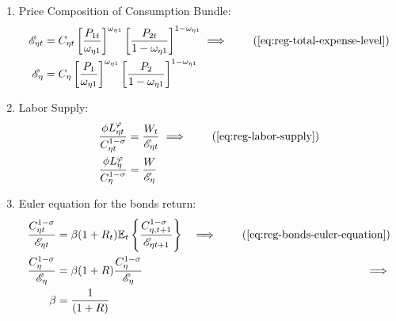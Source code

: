 \documentclass[../thesis.tex]{subfiles}
\begin{document}
\begin{enumerate}
\begin{comment}
	\item Regional Consumption of good 1:
\begin{align}
	C_{\eta 1 t} &= \te \frac{\omega_{\eta 1}}{P_{1 t}} \implies \tag{\ref{eq:reg-Cn-Cn-2}} \\
	C_{\eta 1} &= \te[] \frac{\omega_{\eta 1}}{P_{1}} \label{eq:reg-ss-C1-Cn-2}
\end{align}

\item Regional Consumption of good 2:
\begin{align}
	C_{\eta 2 t} &= \te \frac{1 -\omega_{\eta 1}}{P_{2 t}} \implies \tag{\ref{eq:reg-Cn-Cv-2}} \\
	C_{\eta 2} &= \te[] \frac{1 -\omega_{\eta 1}}{P_{2}} \label{eq:reg-ss-C2-Cn-2}
\end{align}

	
\end{comment}

	\item Price Composition of Consumption Bundle:
	\begin{align}
		\te &= C_{\eta t} \left[ \frac{P_{1 t}}{\omega_{\eta 1}} \right]^{\omega_{\eta 1}} \left[ \frac{P_{2 t}}{1 -\omega_{\eta 1}} \right]^{1 -\omega_{\eta 1}} \implies \tag{\ref{eq:reg-total-expense-level}} 
		\\
		\te[] &= C_{\eta} \left[ \frac{P_{1}}{\omega_{\eta 1}} \right]^{\omega_{\eta 1}} \left[ \frac{P_{2}}{1 -\omega_{\eta 1}} \right]^{1 -\omega_{\eta 1}} \label{eq:reg-ss-price-eta-level}
	\end{align}

	\item Labor Supply:
	\begin{align}
		\frac{\phi L_{\eta t}^{\varphi}}{C_{\eta t}^{1-\sigma}} &= \frac{W_t}{\te} \implies \tag{\ref{eq:reg-labor-supply}} \\
		\frac{\phi L_{\eta}^{\varphi}}{C_{\eta}^{1-\sigma}} &= \frac{W}{\te[]} \label{eq:reg-ss-household-labor-supply}
	\end{align}

	\item Euler equation for the bonds return:
	\begin{alignat}{2}
		\frac{ C_{\eta t}^{1-\sigma}}{ \te} &= \beta (1 + R_{t}) \E \left\{ \frac{ C_{\eta, t+1}^{1-\sigma}}{ \te[t+1]} \right\} &\implies \tag{\ref{eq:reg-bonds-euler-equation}} 
		\\
		\frac{ C_{\eta}^{1-\sigma}}{ \te[]} &= \beta (1 + R) \frac{ C_{\eta}^{1-\sigma}}{ \te[]} &\implies \nonumber 
		\\
		\beta &= \frac{1}{(1 + R)} \label{eq:reg-ss-bonds-euler-equation}
	\end{alignat}


\end{enumerate}
\end{document}
